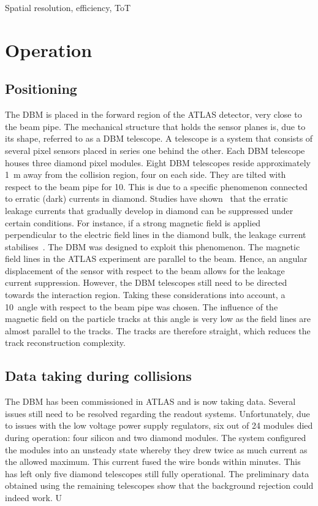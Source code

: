 \documentclass[12pt]{packages/mytustyle}  %
\begin{document}
Spatial resolution, efficiency, ToT


\section{Operation}
\label{sec:operation}

\subsection{Positioning}
The DBM is placed in the forward region of the ATLAS detector, very close to the beam pipe. The mechanical structure that holds the sensor planes is, due to its shape, referred to as a DBM telescope. A telescope is a system that consists of several pixel sensors placed in series one behind the other. Each DBM telescope houses three diamond pixel modules. Eight DBM telescopes reside approximately 1~m away from the collision region, four on each side. They are tilted with respect to the beam pipe for 10\textdegree. This is due to a specific phenomenon connected to erratic (dark) currents in diamond. Studies have shown~\cite{} that the erratic leakage currents that gradually develop in diamond can be suppressed under certain conditions. For instance, if a strong magnetic field is applied perpendicular to the electric field lines in the diamond bulk, the leakage current stabilises~\cite{}. The DBM was designed to exploit this phenomenon. The magnetic field lines in the ATLAS experiment are parallel to the beam. Hence, an angular displacement of the sensor with respect to the beam allows for the leakage current suppression. However, the DBM telescopes still need to be directed towards the interaction region. Taking these considerations into account, a 10\textdegree~angle with respect to the beam pipe was chosen. The influence of the magnetic field on the particle tracks at this angle is very low as the field lines are almost parallel to the tracks. The tracks are therefore straight, which reduces the track reconstruction complexity.


\subsection{Data taking during collisions}
The DBM has been commissioned in ATLAS and is now taking data. Several issues still need to be resolved regarding the readout systems. Unfortunately, due to issues with the low voltage power supply regulators, six out of 24 modules died during operation: four silicon and two diamond modules. The system configured the modules into an unsteady state whereby they drew twice as much current as the allowed maximum. This current fused the wire bonds within minutes. This has left only five diamond telescopes still fully operational. The preliminary data obtained using the remaining telescopes show that the background rejection could indeed work. U
\end{document}
